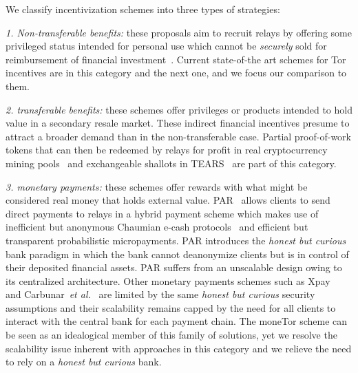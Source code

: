 We classify incentivization schemes into three types of strategies:

	\emph{1. Non-transferable benefits:} these proposals aim to recruit relays by offering some
	 privileged status intended for personal use which cannot be \emph{securely} sold for reimbursement
	  of financial investment~\cite{dingledine2010building,jansen2010recruiting, jansen2013lira}. Current state-of-the art schemes for Tor incentives are in this category and the next one, and we focus our comparison to them.
	  
	\emph{2. transferable benefits:} these schemes offer
privileges or products intended to hold value in a secondary resale market. These
indirect financial incentives presume to attract a broader demand than in the
non-transferable case. Partial proof-of-work tokens that can then be redeemed by relays for
profit in real cryptocurrency mining pools~\cite{biryukov2015proof} and exchangeable shallots in TEARS~\cite{jansen2014onions} are part of this category.

	\emph{3. monetary payments:} these schemes offer rewards with what might be considered
real money that holds external value. PAR~\cite{androulaki2008payment}
allows clients to send direct payments to relays in a hybrid payment scheme
which makes use of inefficient but anonymous Chaumian e-cash
protocols~\cite{chaum1988untraceable} and efficient but transparent
probabilistic micropayments. PAR introduces the \emph{honest but curious} bank
paradigm in which the bank cannot deanonymize clients but is in control of their
deposited financial assets. PAR suffers from an unscalable
design owing to its centralized architecture. Other monetary payments schemes such as Xpay~\cite{chen2009xpay} and Carbunar~\textit{et al.}~\cite{carbunar2012tipping} are limited by the same \emph{honest but curious} security assumptions and their scalability
remains capped by the need for all clients to interact with the central bank for each payment chain. The moneTor scheme can be seen as an idealogical member of this family of solutions, yet we resolve the scalability issue inherent with approaches in this category and we relieve the need to rely on a \textit{honest but curious} bank.



